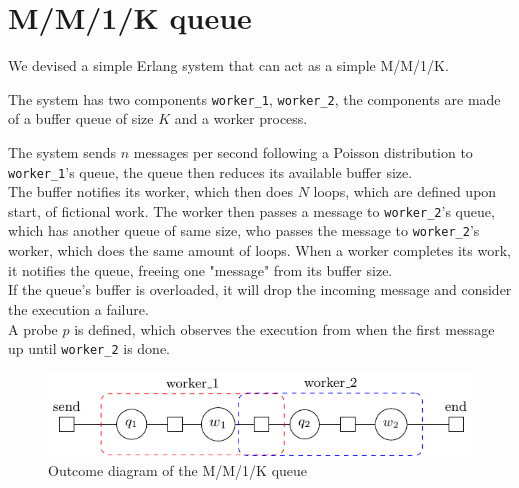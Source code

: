 \section{M/M/1/K queue}
    We devised a simple Erlang system that can act as a simple M/M/1/K.

        The system has two components \texttt{worker\_1}, \texttt{worker\_2}, the components are made of a buffer queue of size $K$ and a worker process.
    
    The system sends $n$ messages per second following a Poisson distribution to \texttt{worker\_1}'s queue, the queue then reduces its available buffer size. \\
    
    The buffer notifies its worker, which then does $N$ loops, which are defined upon start, of fictional work. The worker then passes a message to \texttt{worker\_2}'s queue, which has another queue of same size, who passes the message to \texttt{worker\_2}'s worker, which does the same amount of loops. When a worker completes its work, it notifies the queue, freeing one "message" from its buffer size. \\
    
    If the queue's buffer is overloaded, it will drop the incoming message and consider the execution a failure. \\
    
    A probe $p$ is defined, which observes the execution from when the first message up until \texttt{worker\_2} is done.
    \begin{figure}[H]
        \begin{center}
            \includegraphics[scale=1.2, width=\textwidth]{tikz/mm1k.pdf} 
        \end{center}
        \caption{Outcome diagram of the M/M/1/K queue}
    \end{figure}
